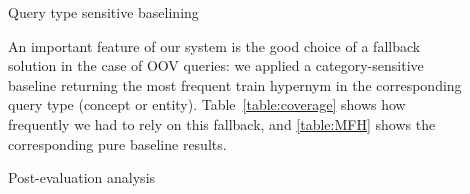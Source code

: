 \documentclass{beamer}
\newlength{\sepwid}
\newlength{\onecolwid}
\begin{document}
\begin{frame}[t]
\begin{columns}[t]
\begin{column}{\onecolwid}



\end{column} 


\begin{column}{\sepwid} %
\end{column}

\begin{column}{\onecolwid} %


\begin{block}{Query type sensitive baselining}



An important feature of our system is the good choice of a fallback solution
in the case of OOV queries: we applied a category-sensitive baseline returning
the most frequent train hypernym in the corresponding query type (concept or
entity).  Table~\ref{table:coverage} shows how frequently we had to rely on
this fallback, and \autoref{table:MFH} shows the corresponding pure baseline
results.



\end{block}

\begin{block}{Post-evaluation analysis}



\end{block}
\end{column}
\end{columns}
\end{frame}
\end{document}
